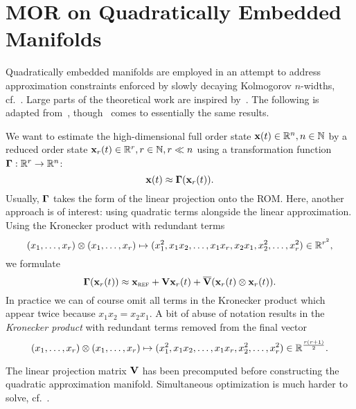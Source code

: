 \section{MOR on Quadratically Embedded Manifolds}

Quadratically embedded manifolds are employed in an attempt to address approximation constraints enforced by slowly decaying Kolmogorov $n$-widths, cf.~\cite{Geelen2023, Barnett2022}.
Large parts of the theoretical work are inspired by~\cite{Jain2017, Rutzmoser2017, Tatsis2019}.
The following is adapted from~\cite{Geelen2023}, though~\cite{Barnett2022} comes to essentially the same results.

We want to estimate the high-dimensional full order state $\mathbf{x}(t) \in \mathbb{R}^n, n \in \mathbb{N}$ by a reduced order state $\mathbf{x}_r(t) \in \mathbb{R}^r, r \in \mathbb{N}, r \ll n$ using a transformation function $\mathbf{\Gamma}: \mathbb{R}^r \rightarrow \mathbb{R}^n$:
\begin{equation}
    \mathbf{x}(t) \approx \mathbf{\Gamma}(\mathbf{x}_r(t)).
\end{equation}
Usually, $\mathbf{\Gamma}$ takes the form of the linear projection onto the ROM\@.
Here, another approach is of interest: using quadratic terms alongside the linear approximation.
Using the Kronecker product with redundant terms
\[
    (x_1, \dots, x_r) \otimes (x_1, \dots, x_r) \mapsto (x_1^2, x_1 x_2, \dots, x_1 x_r, x_2 x_1, x_2^2, \dots, x_r^2) \in \mathbb{R}^{r^2},
\]
we formulate
\begin{equation}
    \mathbf{\Gamma}(\mathbf{x}_r(t)) \approx \mathbf{x}_{\textsc{ref}} + \mathbf{V} \mathbf{x}_r(t) + \overline{\mathbf{V}}(\mathbf{x}_r(t) \otimes \mathbf{x}_r(t)).
\end{equation}
In practice we can of course omit all terms in the Kronecker product which appear twice because $x_1 x_2 = x_2 x_1$.
A bit of abuse of notation results in the \emph{Kronecker product} with redundant terms removed from the final vector
\[
    (x_1, \dots, x_r) \otimes (x_1, \dots, x_r) \mapsto (x_1^2, x_1 x_2, \dots, x_1 x_r, x_2^2, \dots, x_r^2) \in \mathbb{R}^{\frac{r (r + 1)}{2}}.
\]

\begin{assumption}
    The linear projection matrix $\mathbf{V}$ has been precomputed before constructing the quadratic approximation manifold.
    Simultaneous optimization is much harder to solve, cf.~\cite[Remark~1]{Geelen2023}.
\end{assumption}

